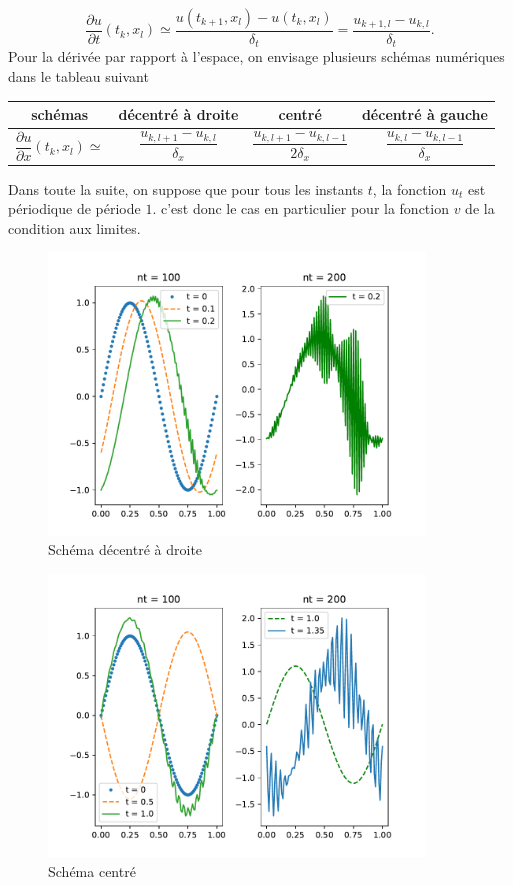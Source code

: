 \[
 \frac{\partial u}{\partial t}(t_k,x_l) \simeq \frac{u(t_{k+1},x_l) - u(t_{k},x_l)}{\delta_t} = \frac{u_{k+1,l} - u_{k,l}}{\delta_t}.
\]
Pour la dérivée par rapport à l'espace, on envisage plusieurs schémas numériques dans le tableau suivant
\begin{center}
\renewcommand{\arraystretch}{2.4}
\begin{tabular}{|c|c|c|c|}\hline
schémas                                         & décentré à droite                                    & centré                                                  & décentré à gauche\\ \hline
$\dfrac{\partial u}{\partial x}(t_k,x_l) \simeq$ & $\dfrac{u_{k,l+1} - u_{k,l}}{\delta_x}$ & $\dfrac{u_{k,l+1} - u_{k,l-1}}{2\delta_x}$ & $\dfrac{u_{k,l} - u_{k,l-1}}{\delta_x}$ \\  \hline
\end{tabular}
\end{center}
Dans toute la suite, on suppose que pour tous les instants $t$, la fonction $u_t$ est périodique de période $1$. c'est donc le cas en particulier pour la fonction $v$ de la condition aux limites.
\begin{figure}[h]
 \centering
 \includegraphics[width=10cm]{./Eequtransp_1.pdf}
 \caption{Schéma décentré à droite}
 \label{fig: Eequtransp_1}
\end{figure}

\begin{figure}[h]
 \centering
 \includegraphics[width=10cm]{./Eequtransp_2.pdf}
 \caption{Schéma centré}
 \label{fig: Eequtransp_2}
\end{figure}


